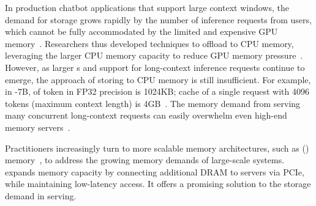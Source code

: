 In production chatbot applications that support large context windows, the demand for \kvcache storage grows rapidly by the number of inference requests from users, which cannot be fully accommodated  by the limited and expensive GPU memory~\cite{miao2023towards}.
Researchers thus developed techniques to offload \kvcache to CPU memory, leveraging the larger CPU memory capacity to reduce GPU memory pressure~\cite{memserve, cacheblend,sheng2023flexgen}. 
However, as larger \llm{}s and support for long-context inference requests continue to emerge, the approach of storing \kvcache to CPU memory is still insufficient. 
For example, in -7B, \kvcache of token in FP32 precision is 1024KB; \kv cache of a single request with 4096 tokens (maximum context length) is 4GB~\cite{llama2}.
The memory demand from serving many concurrent long-context requests can easily overwhelm even high-end memory servers~\cite{pagedattenion,liu2023cachegen}. 

Practitioners increasingly turn to more scalable memory architectures, such as \cxlfull (\cxl) memory~\cite{cxl1, cxl2, pond}, to address the growing memory demands of large-scale systems. 
\cxl{} expands memory capacity by connecting additional DRAM to servers via PCIe, while maintaining low-latency access. It offers a promising solution to the \kvcache storage demand in \llm serving.

